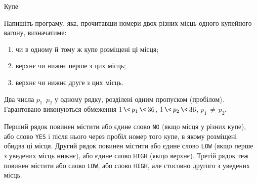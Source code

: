 \vspace{-1\baselineskip}

\begin{problemAllDefault}{Купе}



\ifAfour
\vspace{-0.5\baselineskip}
\else
\vspace{0.5\baselineskip}
\fi

Напишіть програму, яка, прочитавши номери двох різних місць одного купейного вагону, визначатиме:
\begin{enumerate}
\item
чи в одному й тому ж купе розміщені ці місця;
\item
верхнє чи нижнє перше з цих місць;
\item
верхнє чи нижнє друге з цих місць.
\end{enumerate} %

\InputFile Два числа $p_1\,\,\,p_2$ у одному рядку, розділені одним пропуском (пробілом). Гарантовано виконуються обмеження ${1\,{\<}\,p_1\,{\<}\,36}$, ${1\,{\<}\,p_2\,{\<}\,36}$, ${p_1\,{\neq}\,p_2}$.

\OutputFile Перший рядок повинен містити або єдине слово \texttt{NO} (якщо місця у різних купе), або слово \texttt{YES} і після нього через пробіл номер того купе, в якому розміщені обидва ці місця. Другий рядок повинен містити або єдине слово \texttt{LOW} (якщо перше з уведених місць нижнє), або єдине слово \texttt{HIGH} (якщо верхнє). Третій рядок теж повинен містити або слово \texttt{LOW}, або слово \texttt{HIGH}, але стосовно другого з уведених місць.


\end{problemAllDefault}
